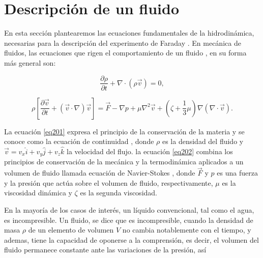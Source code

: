 \section{Descripción de un fluido}

En esta sección plantearemos las ecuaciones fundamentales de la hidrodinámica, necesarias para la descripción del experimento de Faraday \cite{Faraday1831a}. En mecánica de fluidos, las ecuaciones que rigen el comportamiento de un fluido \cite{Landau1987, Batchelor2002, Lamb1975}, en su forma más general son:

\begin{equation} \label{eq201}
   \frac{\partial \rho}{\partial t} + \nabla \cdot (\rho \vec{v}) = 0,
\end{equation}


\begin{equation}\label{eq202}
   \rho \left[\frac{\partial \vec{v}}{\partial t} + (\vec{v} \cdot \nabla ) \vec{v}\right] = \vec{F} - \nabla p + \mu  \nabla^2 \vec{v} + (\zeta + \frac{1}{3} \mu) \nabla (\nabla \cdot \vec{v}).
\end{equation} \medskip


\noindent La ecuación \ref{eq201} expresa el principio de la conservación de la materia y se conoce como la ecuación de continuidad , donde $\rho$ es la densidad del fluido y $\vec{v} = v_x\hat{i} + v_y\hat{j} + v_z\hat{k}$ la velocidad del flujo. la ecuación \ref{eq202} combina los principios de conservación de la mecánica y la termodinámica aplicados a un volumen de fluido llamada ecuación de Navier-Stokes , donde $\vec{F}$ y $p$ es una fuerza y la presión que actúa sobre el volumen de fluido, respectivamente, $\mu$ es la viscosidad dinámica y $\zeta$ es la segunda viscosidad.

En la mayoría de los casos de interés, un líquido convencional, tal como el agua, es incompresible. Un fluido, se dice que es incompresible, cuando la densidad de masa $\rho$ de un elemento de volumen $V$ no cambia notablemente con el tiempo, y ademas, tiene la capacidad de oponerse a la comprensión, es decir, el volumen del fluido permanece constante ante las variaciones de la presión, así

